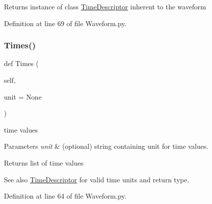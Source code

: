 \begin{DoxyReturn}{Returns}
instance of class \hyperlink{namespaceSignalIntegrity_1_1TimeDomain_1_1Waveform_1_1TimeDescriptor}{Time\+Descriptor} inherent to the waveform 
\end{DoxyReturn}


Definition at line 69 of file Waveform.\+py.

\mbox{\label{classSignalIntegrity_1_1TimeDomain_1_1Waveform_1_1Waveform_1_1Waveform_a5ba53f81d111ea013ebb7f55ed99d959}} 
\subsubsection{\texorpdfstring{Times()}{Times()}}
{\footnotesize\ttfamily def Times (\begin{DoxyParamCaption}\item[{}]{self,  }\item[{}]{unit = {\ttfamily None} }\end{DoxyParamCaption})}



time values 


\begin{DoxyParams}{Parameters}
{\em unit} & (optional) string containing unit for time values. \\
\hline
\end{DoxyParams}
\begin{DoxyReturn}{Returns}
list of time values 
\end{DoxyReturn}
\begin{DoxySeeAlso}{See also}
\hyperlink{namespaceSignalIntegrity_1_1TimeDomain_1_1Waveform_1_1TimeDescriptor}{Time\+Descriptor} for valid time units and return type. 
\end{DoxySeeAlso}


Definition at line 64 of file Waveform.\+py.

\mbox{\label{classSignalIntegrity_1_1TimeDomain_1_1Waveform_1_1Waveform_1_1Waveform_a3dc7b1e5eba8fb649156094dfdf7a893}} 

